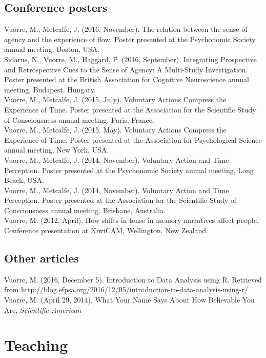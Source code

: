 \documentclass[12pt, letterpaper]{article}
\newcommand{\years}[1]{\marginnote{\scriptsize #1}}
\begin{document}
\subsection*{Conference posters}
\noindent
\years{2016}Vuorre, M., Metcalfe, J. (2016, November). The relation between the sense of agency and the experience of flow. Poster presented at the Psychonomic Society annual meeting, Boston, USA.\\[.15cm]
Sidarus, N., Vuorre, M., Haggard, P. (2016, September). Integrating Prospective and Retrospective Cues to the Sense of Agency: A Multi-Study Investigation. Poster presented at the British Association for Cognitive Neuroscience annual meeting, Budapest, Hungary.\\[.15cm]
\years{2015}Vuorre, M., Metcalfe, J. (2015, July). Voluntary Actions Compress the Experience of Time. Poster presented at the Association for the Scientific Study of Consciousness annual meeting, Paris, France.\\[.15cm]
Vuorre, M., Metcalfe, J. (2015, May). Voluntary Actions Compress the Experience of Time. Poster presented at the Association for Psychological Science annual meeting, New York, USA.\\[.25cm]
\years{2014}Vuorre, M., Metcalfe, J. (2014, November). Voluntary Action and Time Perception. Poster presented at the Psychonomic Society annual meeting, Long Beach, USA.\\[.15cm]
Vuorre, M., Metcalfe, J. (2014, November). Voluntary Action and Time Perception. Poster presented at the Association for the Scientific Study of Consciousness annual meeting, Brisbane, Australia.\\[.25cm]
\years{2012}Vuorre, M. (2012, April). How shifts in tense in memory narratives affect people. Conference presentation at KiwiCAM, Wellington, New Zealand.

\subsection*{Other articles}
\noindent
\years{2016}Vuorre, M. (2016, December 5). Introduction to Data Analysis using R. Retrieved from \url{http://blog.efpsa.org/2016/12/05/introduction-to-data-analysis-using-r/}\\[.15cm]
\years{2014}Vuorre, M. (April 29, 2014), What Your Name Says About How Believable You Are, \emph{Scientific American}

\section*{Teaching}
\end{document}
